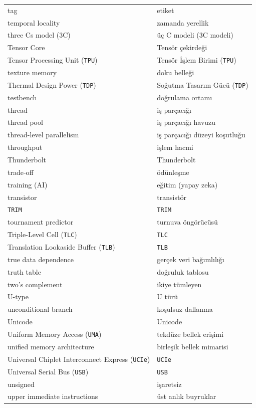 {\begin{longtable}{@{}p{7.6cm}p{7.6cm}@{}}
tag & etiket \\
temporal locality & zamanda yerellik \\
three Cs model (3C) & üç C modeli (3C modeli) \\
Tensor Core & Tensör çekirdeği \\
Tensor Processing Unit (\texttt{TPU}) & Tensör İşlem Birimi (\texttt{TPU}) \\
texture memory & doku belleği \\
Thermal Design Power (\texttt{TDP}) & Soğutma Tasarım Gücü (\texttt{TDP}) \\
testbench & doğrulama ortamı \\
thread & iş parçacığı \\
thread pool & iş parçacığı havuzu \\
thread-level parallelism & iş parçacığı düzeyi koşutluğu \\
throughput & işlem hacmi \\
Thunderbolt & Thunderbolt \\
trade-off & ödünleşme \\
training (AI) & eğitim (yapay zeka) \\
transistor & transistör \\
\texttt{TRIM} & \texttt{TRIM} \\
tournament predictor & turnuva öngörücüsü \\
Triple-Level Cell (\texttt{TLC}) & \texttt{TLC} \\
Translation Lookaside Buffer (\texttt{TLB}) & \texttt{TLB} \\
true data dependence & gerçek veri bağımlılığı \\
truth table & doğruluk tablosu \\
two's complement & ikiye tümleyen \\

U-type & U türü \\
unconditional branch & koşulsuz dallanma \\
Unicode & Unicode \\
Uniform Memory Access (\texttt{UMA}) & tekdüze bellek erişimi \\
unified memory architecture & birleşik bellek mimarisi \\
Universal Chiplet Interconnect Express (\texttt{UCIe}) & \texttt{UCIe} \\
Universal Serial Bus (\texttt{USB}) & \texttt{USB} \\
unsigned & işaretsiz \\
upper immediate instructions & üst anlık buyruklar \\


\end{longtable}}
